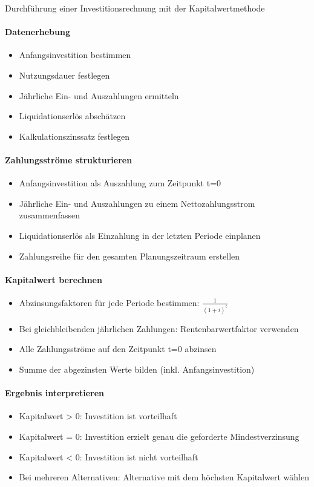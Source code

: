 \begin{KR}{Durchführung einer Investitionsrechnung mit der Kapitalwertmethode}\\
\paragraph{Datenerhebung}
\begin{itemize}
    \item Anfangsinvestition bestimmen
    \item Nutzungsdauer festlegen
    \item Jährliche Ein- und Auszahlungen ermitteln
    \item Liquidationserlös abschätzen
    \item Kalkulationszinssatz festlegen
\end{itemize}

\paragraph{Zahlungsströme strukturieren}
\begin{itemize}
    \item Anfangsinvestition als Auszahlung zum Zeitpunkt t=0
    \item Jährliche Ein- und Auszahlungen zu einem Nettozahlungsstrom zusammenfassen
    \item Liquidationserlös als Einzahlung in der letzten Periode einplanen
    \item Zahlungsreihe für den gesamten Planungszeitraum erstellen
\end{itemize}

\paragraph{Kapitalwert berechnen}
\begin{itemize}
    \item Abzinsungsfaktoren für jede Periode bestimmen: $\frac{1}{(1+i)^t}$
    \item Bei gleichbleibenden jährlichen Zahlungen: Rentenbarwertfaktor verwenden
    \item Alle Zahlungsströme auf den Zeitpunkt t=0 abzinsen
    \item Summe der abgezinsten Werte bilden (inkl. Anfangsinvestition)
\end{itemize}

\paragraph{Ergebnis interpretieren}
\begin{itemize}
    \item Kapitalwert > 0: Investition ist vorteilhaft
    \item Kapitalwert = 0: Investition erzielt genau die geforderte Mindestverzinsung
    \item Kapitalwert < 0: Investition ist nicht vorteilhaft
    \item Bei mehreren Alternativen: Alternative mit dem höchsten Kapitalwert wählen
\end{itemize}


\end{KR}
